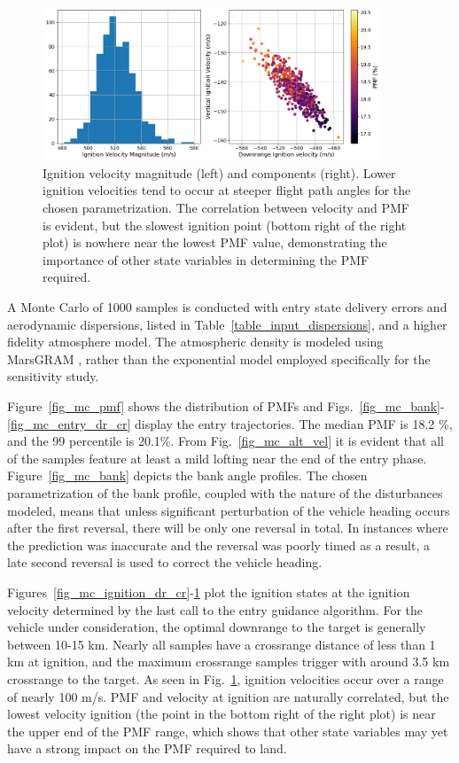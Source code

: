 \begin{figure}[h!]
	\centering
	\includegraphics[width=0.9\textwidth]{../AAS20/ignition_vz_vx} 
	\caption{Ignition velocity magnitude (left) and components (right). Lower ignition velocities tend to occur at steeper flight path angles for the chosen parametrization. The correlation between velocity and PMF is evident, but the slowest ignition point (bottom right of the right plot) is nowhere near the lowest PMF value, demonstrating the importance of other state variables in determining the PMF required.}
	\label{fig_mc_ignition_vel}
\end{figure}
A Monte Carlo of 1000 samples is conducted with entry state delivery errors and aerodynamic dispersions, listed in Table~\ref{table_input_dispersions}, and a higher fidelity atmosphere model. The atmospheric density is modeled using MarsGRAM \cite{MarsGRAM2010User}, rather than the exponential model employed specifically for the sensitivity study. 
 
Figure~\ref{fig_mc_pmf} shows the distribution of PMFs and
Figs.~\ref{fig_mc_bank}-\ref{fig_mc_entry_dr_cr} display the entry trajectories. The median PMF is 18.2 \%, and the 99 percentile is 20.1\%. From Fig.~\ref{fig_mc_alt_vel} it is evident that all of the samples feature at least a mild lofting near the end of the entry phase. 
Figure~\ref{fig_mc_bank} depicts the bank angle profiles. The chosen parametrization of the bank profile, coupled with the nature of the disturbances modeled, means that unless significant perturbation of the vehicle heading occurs after the first reversal, there will be only one reversal in total. In instances where the prediction was inaccurate and the reversal was poorly timed as a result, a late second reversal is used to correct the vehicle heading. 

Figures~\ref{fig_mc_ignition_dr_cr}-\ref{fig_mc_ignition_vel} plot the ignition states at the ignition velocity determined by the last call to the entry guidance algorithm. For the vehicle under consideration, the optimal downrange to the target is generally between 10-15 km. Nearly all samples have a crossrange distance of less than 1 km at ignition, and the maximum crossrange samples trigger with around 3.5 km crossrange to the target. As seen in Fig.~\ref{fig_mc_ignition_vel}, ignition velocities occur over a range of nearly 100 m/s. PMF and velocity at ignition are naturally correlated, but the lowest velocity ignition (the point in the bottom right of the right plot) is near the upper end of the PMF range, which shows that other state variables may yet have a strong impact on the PMF required to land.

